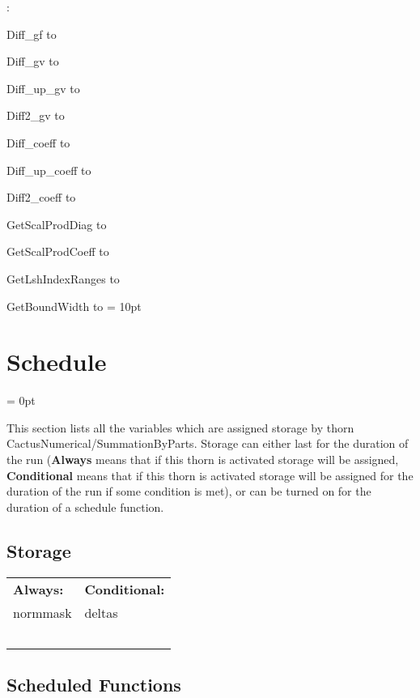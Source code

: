 \vspace{5mm}

: 



Diff\_gf to 

Diff\_gv to 

Diff\_up\_gv to 

Diff2\_gv to 

Diff\_coeff to 

Diff\_up\_coeff to 

Diff2\_coeff to 

GetScalProdDiag to 

GetScalProdCoeff to 

GetLshIndexRanges to 

GetBoundWidth to 
\vspace{2mm}\parskip = 10pt 

\section{Schedule} 


\parskip = 0pt


\noindent This section lists all the variables which are assigned storage by thorn CactusNumerical/SummationByParts.  Storage can either last for the duration of the run ({\bf Always} means that if this thorn is activated storage will be assigned, {\bf Conditional} means that if this thorn is activated storage will be assigned for the duration of the run if some condition is met), or can be turned on for the duration of a schedule function.


\subsection*{Storage}

\hspace{5mm}

 \begin{tabular*}{160mm}{ll} 

{\bf Always:}& {\bf Conditional:} \\ 
 normmask &  deltas\\ 
~ & ~\\ 
\end{tabular*} 


\subsection*{Scheduled Functions}
\vspace{5mm}


